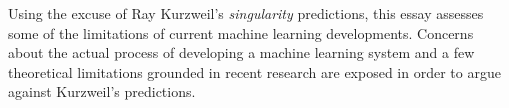 Using the excuse of Ray Kurzweil's \textit{singularity} predictions, this essay 
assesses some of the limitations of current machine learning developments. Concerns 
about the actual process of developing a machine learning system and a few 
theoretical limitations grounded in recent research are exposed in order to 
argue against Kurzweil's predictions. 